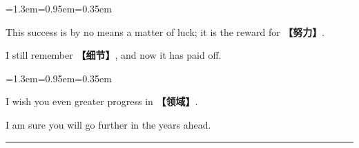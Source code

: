 \documentclass[10pt,a4paper]{ctexart}
\begin{document}
\begin{list}{}{\leftmargin=1.3em=0.95em=0.35em\itemindent=0pt\topsep=0pt\partopsep=0pt\parsep=1.5pt\itemsep=0pt}
\item[{\color{accent}\scriptsize$\blacktriangleright$}]{\footnotesize This success is by no means a matter of luck; it is the reward for {\color{accent}\bfseries 【努力】}.}\par{}
\item[{\color{accent}\scriptsize$\blacktriangleright$}]{\footnotesize I still remember {\color{accent}\bfseries 【细节】}, and now it has paid off.}\par{}
\end{list}
\par\vspace{1pt}
\begin{list}{}{\leftmargin=1.3em=0.95em=0.35em\itemindent=0pt\topsep=0pt\partopsep=0pt\parsep=1.5pt\itemsep=0pt}
\item[{\color{accent}\scriptsize$\blacktriangleright$}]{\footnotesize I wish you even greater progress in {\color{accent}\bfseries 【领域】}.}\par{}
\item[{\color{accent}\scriptsize$\blacktriangleright$}]{\footnotesize I am sure you will go further in the years ahead.}\par{}
\end{list}
\par
\endgroup
\vspace{4pt}\par\nopagebreak
{\color{rule}\rule{\linewidth}{0.6pt}}\par\nopagebreak
\vspace{1pt}
\end{document}
